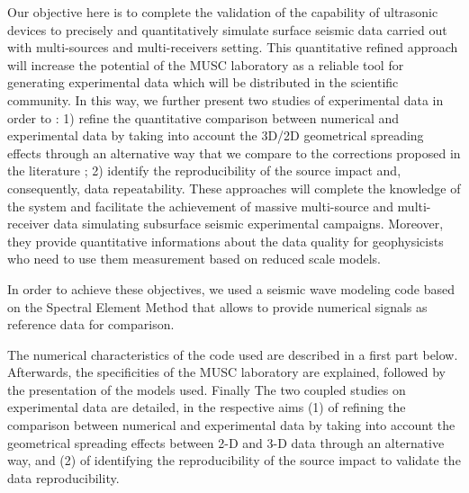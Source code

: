 \documentclass[manuscript,revised]{geophysics}
\newcommand{\twod}{2-D }
\newcommand{\thrd}{3-D }
\begin{document}
\noindent Our objective here is to complete the validation of the capability of ultrasonic devices to precisely and quantitatively simulate surface seismic data carried out with multi-sources and multi-receivers setting. This quantitative refined approach will increase the potential of the MUSC laboratory as a reliable tool for generating experimental data which will be distributed in the scientific community.
\noindent In this way, we further present two studies of experimental data in order to : 1) refine the quantitative comparison between numerical and experimental data by taking into account the 3D/2D geometrical spreading effects through an alternative way that we compare to the corrections proposed in the literature ; 2) identify the reproducibility of the source impact and, consequently, data repeatability. These approaches will complete the knowledge of the system and facilitate the achievement of massive multi-source and multi-receiver data simulating subsurface seismic experimental campaigns. Moreover, they provide quantitative informations about the data quality for geophysicists who need to use them measurement based on reduced scale models. 

\noindent In order to achieve these objectives, we used a seismic wave modeling code based on the Spectral Element Method \citep{Komatitsch_SEM_1998,Komatitsch_ISM_1999,Komatitsch_SEM_2005,Festa_PML_2005} that allows to provide numerical signals as reference data for comparison. %


\noindent The numerical characteristics of the code used are described in a first part below. Afterwards, the specificities of the MUSC laboratory are explained, followed by the presentation of the models used. Finally The two coupled studies on experimental data are detailed, in the respective aims (1) of refining the comparison between numerical and experimental data by taking into account the geometrical spreading effects between \twod and \thrd data through an alternative way, and (2) of identifying the reproducibility of the source impact to validate the data reproducibility.
\end{document}
